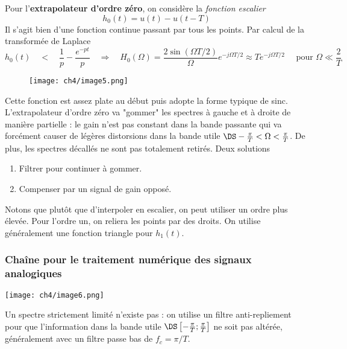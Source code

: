 		Pour l'\textbf{extrapolateur d'ordre zéro}, on considère la \textit{fonction escalier}
		\begin{equation}
		h_0(t) = u(t)-u(t-T)
		\end{equation}
		Il s'agit bien d'une fonction continue passant par tous les points. Par calcul de la 
		transformée de Laplace
		\begin{equation}
		h_0(t)\quad\lt\quad \frac{1}{p}-\frac{e^{-pt}}{p}\quad\Longrightarrow\quad
		H_0(\Omega) = \frac{2\sin(\Omega T/2)}{\Omega}e^{-j\Omega T/2}\approx Te^{-j\Omega T/2}\quad 
		\text{ pour }\Omega \ll \frac{2}{T}
		\end{equation}
		
			\begin{wrapfigure}[10]{l}{7cm}
	\texttt{[image: ch4/image5.png]}
	\end{wrapfigure}	
		Cette fonction est assez plate au début puis adopte la forme typique de sinc.
		L'extrapolateur d'ordre zéro va "gommer" les spectres à gauche et à droite de manière 
		partielle : le gain n'est pas constant dans la bande passante qui va forcément causer de 
		légères distorsions dans la bande utile $\DS -\frac{\pi}{T}<\Omega<\frac{\pi}{T}$. De plus, 
		les spectres décallés ne sont pas totalement retirés. Deux solutions 
		\begin{enumerate}
		\item Filtrer pour continuer à gommer.
		\item Compenser par un signal de gain opposé.
		\end{enumerate}
		
	Notons que plutôt que d'interpoler en escalier, on peut utiliser un ordre plus élevée. Pour 
	l'ordre un, on reliera les points par des droits. On utilise généralement une fonction 
	triangle pour $h_1(t)$.
	
	\subsubsection{Chaîne pour le traitement numérique des signaux analogiques}
	\begin{center}
		\texttt{[image: ch4/image6.png]}
	\end{center}
	Un spectre strictement limité n'existe pas : on utilise un filtre anti-repliement pour 
	que l'information dans la bande utile $\DS \left[-\frac{\pi}{T};\frac{\pi}{T}\right]$ ne 
	soit pas altérée, généralement avec un filtre passe bas de $f_c = \pi/T$.\\
	
